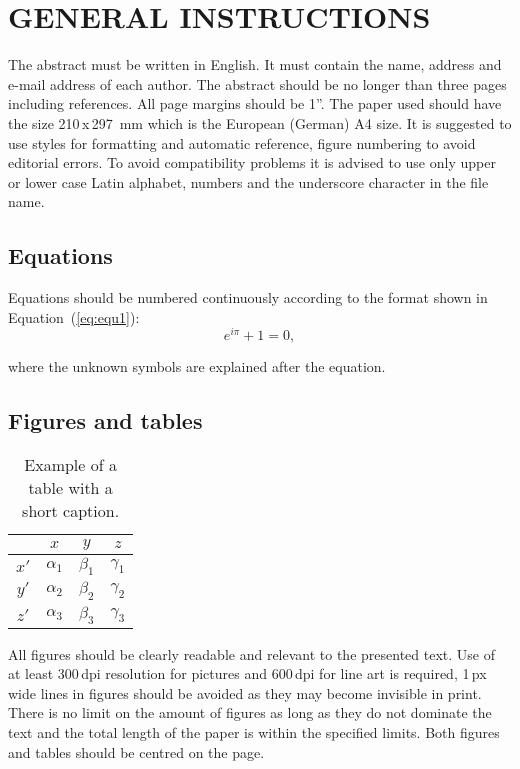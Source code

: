 \documentclass{icsc}
\begin{document}
\section{GENERAL INSTRUCTIONS}
%
The abstract must be written in English. It must contain the name, address and
e-mail address of each author. The abstract should be no longer than three
pages including references. All page margins should be 1''. The paper used
should have the size 210\,x\,297\, mm which is the European (German) A4 size.
It is suggested to use styles for formatting and automatic reference, figure
numbering to avoid editorial errors. To avoid compatibility problems it is
advised to use only upper or lower case Latin alphabet, numbers and the
underscore character in the file name.

\subsection{Equations}
%
Equations should be numbered continuously according to the format shown in
Equation~(\ref{eq:equ1}):
\begin{equation} \label{eq:equ1}
  e^{i\pi} + 1 = 0,
\end{equation}

where the unknown symbols are explained after the equation.

\subsection{Figures and tables}
%
\begin{table}[h!]
  \begin{center}
    \caption{Example of a table with a short caption.} \label{tab:tab1}
    \begin{tabular}{|c|ccc|}
      \hline
      &  $x$  &  $y$  &  $z$ \\
      \hline
      $x'$  &  $\alpha_1$ & $\beta_1$ & $\gamma_1$ \\
      $y'$  &  $\alpha_2$ & $\beta_2$ & $\gamma_2$ \\
      $z'$  &  $\alpha_3$ & $\beta_3$ & $\gamma_3$ \\
      \hline
    \end{tabular}
  \end{center}
\end{table}
All figures should be clearly readable and relevant to the presented text. Use
of at least 300\,dpi resolution for pictures and 600\,dpi for line art is
required, 1\,px wide lines in figures should be avoided as they may become
invisible in print. There is no limit on the amount of figures as long as they
do not dominate the text and the total length of the paper is within the
specified limits. Both figures and tables should be centred on the page.
\end{document}
